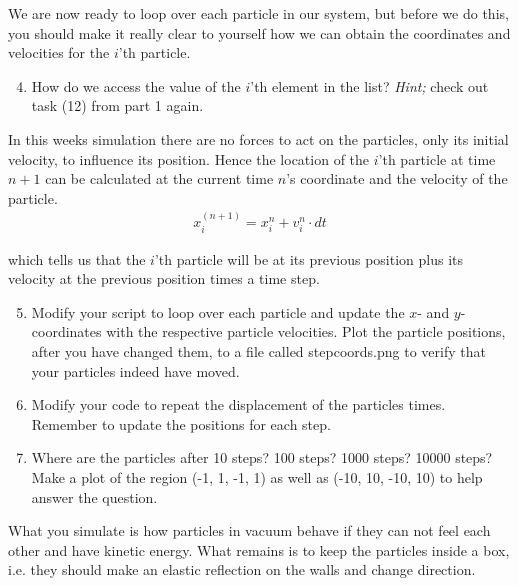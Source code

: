 \documentclass{article}
\begin{document}
We are now ready to loop over each particle in our system, but before we do
this, you should make it really clear to yourself how we can obtain the
coordinates and velocities for the $i$'th particle.

\begin{enumerate}
  \setcounter{enumi}{3}
  \item How do we access the value of the $i$'th element in the  list?
      {\em Hint;} check out task (12) from part 1 again.

\end{enumerate}

In this weeks simulation there are no forces to act on the particles,
only its initial velocity, to influence its position.
Hence the location of the $i$'th particle at time $n+1$ can be
calculated at the current time $n$'s coordinate and the velocity of the
particle.
\begin{align}
  x_i^{(n+1)} = x^n_i + v_{i}^n \cdot dt
\end{align}

which tells us that the $i$'th particle will be at its previous position plus its
velocity at the previous position times a time step.

\begin{enumerate}
  \setcounter{enumi}{4}
  \item
    Modify your script to loop over each particle and update the $x$- and
    $y$-coordinates with the respective particle velocities.
    Plot the particle positions, after you have changed them,
    to a file called stepcoords.png to verify that your particles indeed have
    moved.

  \item Modify your code to repeat the displacement of the particles  times.
      Remember to update the positions for each step.

  \item Where are the particles after 10 steps? 100 steps? 1000 steps? 10000 steps?
    Make a plot of the region (-1, 1, -1, 1) as well as (-10, 10, -10, 10) to
    help answer the question.

\end{enumerate}

What you simulate is how particles in vacuum behave if they can not feel
each other and have kinetic energy. What remains is to keep the particles
inside a box, i.e. they should make an elastic reflection on the walls and
change direction. \\
\end{document}
